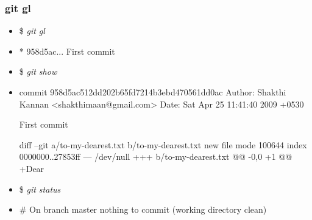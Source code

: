 \documentclass[10pt]{beamer}
\newcommand{\command}[1]{\textsl{\textit{#1}}}
\begin{document}
%
%

\begin{frame}[fragile]
\frametitle{git gl}

\begin{block}{}
\scriptsize
\begin{semiverbatim}
\begin{itemize}[<+-| alert@+>]
\item[]{\$ \command{git gl}}
\item[]{* 958d5ac... First commit}

\item[]{\$ \command{git show}}
\item[]{commit 958d5ac512dd202b65fd7214b3ebd470561dd0ac
Author: Shakthi Kannan <shakthimaan@gmail.com>
Date:   Sat Apr 25 11:41:40 2009 +0530

    First commit

diff --git a/to-my-dearest.txt b/to-my-dearest.txt
new file mode 100644
index 0000000..27853ff
 --- /dev/null
 +++ b/to-my-dearest.txt
@@ -0,0 +1 @@
+Dear}

\item[]{\$ \command{git status}}
\item[]{# On branch master
nothing to commit (working directory clean)}
\end{itemize}
\end{semiverbatim}
\end{block}

\end{frame}

%
%
\end{document}

